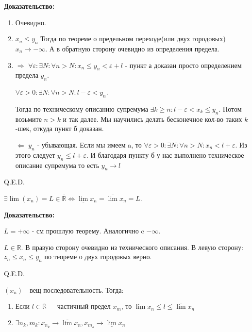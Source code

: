\textbf{Доказательство:}

\begin{enumerate}
    \item Очевидно.
    \item $x_n\leq y_n$ Тогда по теореме о предельном переходе(или двух городовых) $x_n \rightarrow -\infty$. А в обратную сторону очевидно из определения предела.
    \item $\Rightarrow$ $\forall  \varepsilon: \exists N: \forall n> N: x_n\leq y_n < \varepsilon+l$ - пункт а доказан просто определением предела $y_n$.

    $\forall \varepsilon >0: \exists N:\forall n >  N: l-\varepsilon < y_n$. 
    
    Тогда по техническому описанию супремума $\exists k \geq n : l-\varepsilon < x_k \leq y_n$. Потом возьмите $n>k$ и так далее. Мы научились делать бесконечное кол-во таких $k$-шек, откуда пункт б доказан.
    
    $\Leftarrow$ $y_n$ - убывающая. Если мы имеем a, то $\forall \varepsilon>0: \exists N: \forall n > N: x_n < l + \varepsilon$. Из этого следует $y_n\leq l + \varepsilon$. И благодаря пункту б у нас выполнено техническое описание супремума то есть $y_n \rightarrow l$
\end{enumerate}

\hfill Q.E.D.


$\exists \lim(x_n) = L \in \overline{\mathbb{R}} \Leftrightarrow \underline{\lim}x_n = \overline{\lim} x_n = L$.

\textbf{Доказательство:}

$L = + \infty$ - см прошлую теорему. Аналогично c $-\infty$.

$L\in \mathbb{R}$. В правую сторону очевидно из технического описания. В левую сторону: $z_n\leq x_n\leq y_n$ по теореме о двух городовых верно.

\hfill Q.E.D.



$(x_n)$ - вещ последовательность. Тогда:

\begin{enumerate}
    \item Если $l \in \overline{\mathbb{R}} - $ частичный предел $x_m$, то $\underline{\lim}x_n\leq l \leq \overline{\lim}x_n$
    \item $\exists n_k, m_k: x_{n_k}\rightarrow \overline{\lim} x_{n}, x_{m_k}\rightarrow \underline{\lim}x_n$
\end{enumerate}

